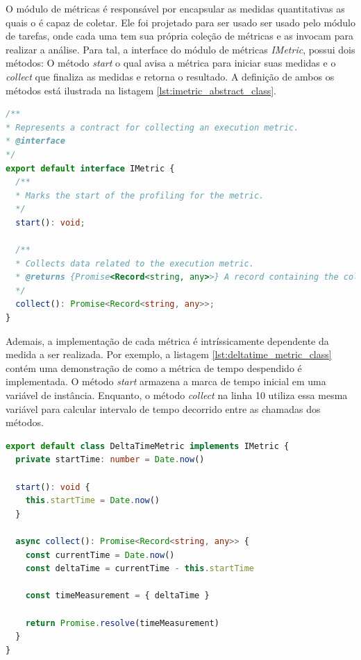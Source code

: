 \documentclass[12pt]{tcc}
\begin{document}
	O módulo de métricas é responsável por encapsular as medidas quantitativas as quais o  é capaz de coletar.
	Ele foi projetado para ser usado ser usado pelo módulo de tarefas,
	onde cada uma tem sua própria coleção de métricas e as invocam para realizar a análise.
	Para tal, a interface do módulo de métricas \emph{IMetric}, possui dois métodos: O método \emph{start} o qual avisa a métrica para iniciar suas medidas e o \emph{collect} que finaliza as medidas e retorna o resultado.
	A definição de ambos os métodos está ilustrada na listagem \ref{lst:imetric_abstract_class}.

\begin{lstlisting}[label={lst:imetric_abstract_class}, caption={Implementação da classe responsável por representar uma métrica.}, language=TypeScript, breaklines=true]
/**
* Represents a contract for collecting an execution metric.
* @interface
*/
export default interface IMetric {
  /**
  * Marks the start of the profiling for the metric.
  */
  start(): void;

  /**
  * Collects data related to the execution metric.
  * @returns {Promise<Record<string, any>>} A record containing the collected metric data.
  */
  collect(): Promise<Record<string, any>>;
}
\end{lstlisting}

	Ademais, a implementação de cada métrica é intríssicamente dependente da medida a ser realizada.
	Por exemplo, a listagem \ref{lst:deltatime_metric_class} contém uma demonstração de como a métrica de tempo despendido é implementada.
	O método \emph{start} armazena a marca de tempo inicial em uma variável de instância.
	Enquanto, o método \emph{collect} na linha 10 utiliza essa mesma variável para calcular intervalo de tempo decorrido entre as chamadas dos métodos.

\begin{lstlisting}[label={lst:deltatime_metric_class}, caption={Fragmento de código da métrica \emph{DeltaTimeMetric} a qual mede o tempo despendido em milisegundos.}, language=TypeScript, breaklines=true]
export default class DeltaTimeMetric implements IMetric {
  private startTime: number = Date.now()

  start(): void {
    this.startTime = Date.now()
  }

  async collect(): Promise<Record<string, any>> {
    const currentTime = Date.now()
    const deltaTime = currentTime - this.startTime
  
    const timeMeasurement = { deltaTime }
  
    return Promise.resolve(timeMeasurement)
  }
}
\end{lstlisting}
\end{document}
